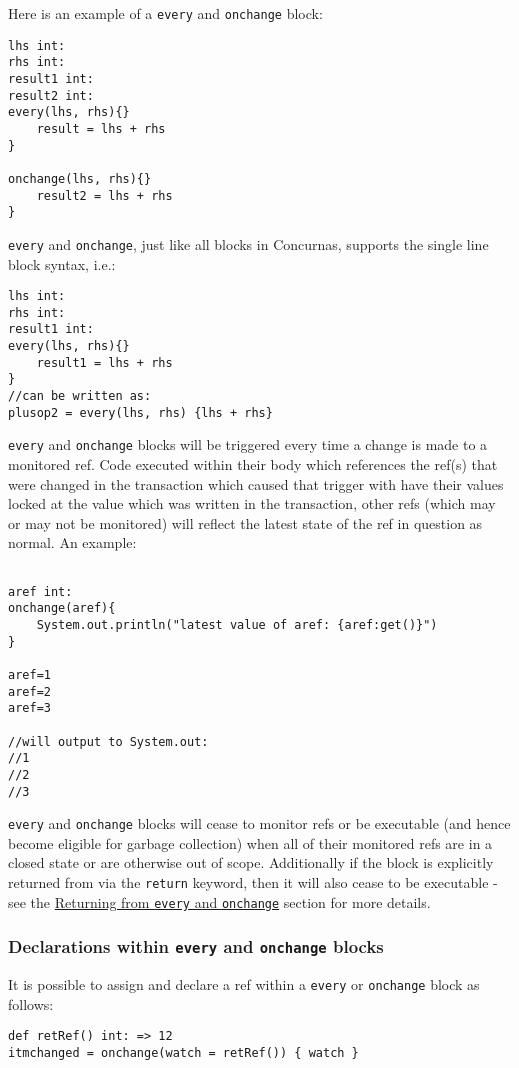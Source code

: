 \documentclass[conc-doc]{subfiles}
\begin{document}
Here is an example of a \lstinline{every} and \lstinline{onchange} block:

\begin{lstlisting}
lhs int:
rhs int:
result1 int:
result2 int:
every(lhs, rhs){}
	result = lhs + rhs
}

onchange(lhs, rhs){}
	result2 = lhs + rhs
}
\end{lstlisting}

\lstinline{every} and \lstinline{onchange}, just like all blocks in Concurnas, supports the single line block syntax, i.e.:
\begin{lstlisting}
lhs int:
rhs int:
result1 int:
every(lhs, rhs){}
	result1 = lhs + rhs
}
//can be written as:
plusop2 = every(lhs, rhs) {lhs + rhs}
\end{lstlisting}	

\lstinline{every} and \lstinline{onchange} blocks will be triggered every time a change is made to a monitored ref. Code executed within their body which references the ref(s) that were changed in the transaction which caused that trigger with have their values locked at the value which was written in the transaction, other refs (which may or may not be monitored) will reflect the latest state of the ref in question as normal. An example:

\begin{lstlisting}

aref int:
onchange(aref){
	System.out.println("latest value of aref: {aref:get()}")
}

aref=1
aref=2
aref=3

//will output to System.out:
//1
//2
//3
\end{lstlisting}	


\lstinline{every} and \lstinline{onchange} blocks will cease to monitor refs or be executable (and hence become eligible for garbage collection) when all of their monitored refs are in a closed state or are otherwise out of scope. Additionally if the block is explicitly returned from via the \lstinline{return} keyword, then it will also cease to be executable - see the \hyperref[subsubsec:returnEveryonechange]{Returning from \lstinline!every! and \lstinline!onchange!} section for more details.

\subsubsection{Declarations within \lstinline{every} and \lstinline{onchange} blocks}
It is possible to assign and declare a ref within a \lstinline{every} or \lstinline{onchange} block as follows:
\begin{lstlisting}
def retRef() int: => 12
itmchanged = onchange(watch = retRef()) { watch }
\end{lstlisting}	
\end{document}
